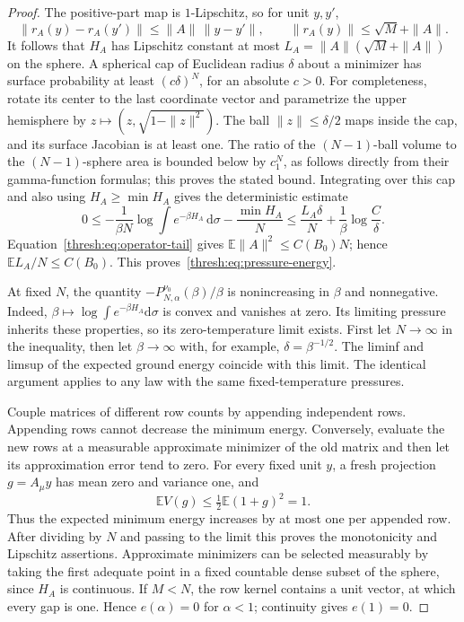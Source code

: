 \documentclass[11pt,a4paper]{article}
\numberwithin{equation}{section}
\theoremstyle{definition}
\theoremstyle{remark}
\newcommand{\E}{\mathbb E}
\newcommand{\dd}{\mathrm d}
\begin{document}
\begin{proof}
The positive-part map is $1$-Lipschitz, so for unit $y,y'$,
\[
 \|r_A(y)-r_A(y')\|\leq\|A\|\,\|y-y'\|,
 \qquad \|r_A(y)\|\leq\sqrt M+\|A\|.
\]
It follows that $H_A$ has Lipschitz constant at most
$L_A=\|A\|(\sqrt M+\|A\|)$ on the sphere.  A spherical cap of Euclidean
radius $\delta$ about a minimizer has surface probability at least
$(c\delta)^N$, for an absolute $c>0$.
For completeness, rotate its center to the last coordinate vector and
parametrize the upper hemisphere by
$z\mapsto(z,\sqrt{1-\|z\|^2})$.  The ball
$\|z\|\leq\delta/2$ maps inside the cap, and its surface Jacobian is at
least one.  The ratio of the $(N-1)$-ball volume to the
$(N-1)$-sphere area is bounded below by $c_1^N$, as follows directly
from their gamma-function formulas; this proves the stated bound.
Integrating over this cap and also using $H_A\geq\min H_A$ gives the
deterministic estimate
\[
 0\leq-\frac1{\beta N}\log\int e^{-\beta H_A}\,\dd\sigma
             -\frac{\min H_A}{N}
 \leq\frac{L_A\delta}{N}+\frac1\beta\log\frac C\delta.
\]
Equation~\eqref{thresh:eq:operator-tail} gives
$\E\|A\|^2\leq C(B_0)N$; hence $\E L_A/N\leq C(B_0)$.
This proves~\eqref{thresh:eq:pressure-energy}.

At fixed $N$, the quantity $-P_{N,\alpha}^{\nu_0}(\beta)/\beta$ is
nonincreasing in $\beta$ and nonnegative.  Indeed,
$\beta\mapsto\log\int e^{-\beta H_A}\dd\sigma$ is convex and vanishes at
zero.  Its limiting pressure inherits these properties, so its
zero-temperature limit exists.  First let $N\to\infty$ in the
inequality, then let $\beta\to\infty$ with, for example,
$\delta=\beta^{-1/2}$.  The liminf and limsup of the expected ground
energy coincide with this limit.  The identical argument applies to
any law with the same fixed-temperature pressures.

Couple matrices of different row counts by appending independent rows.
Appending rows cannot decrease the minimum energy.  Conversely,
evaluate the new rows at a measurable approximate minimizer of the old
matrix and then let its approximation error tend to zero.  For every
fixed unit $y$, a fresh projection $g=A_\mu y$ has mean zero and variance
one, and
\[
 \E V(g)\leq\tfrac12\E(1+g)^2=1.
\]
Thus the expected minimum energy increases by at most one per appended
row.  After dividing by $N$ and passing to the limit this proves the
monotonicity and Lipschitz assertions.  Approximate minimizers can be
selected measurably by taking the first adequate point in a fixed
countable dense subset of the sphere, since $H_A$ is continuous.
If $M<N$, the row kernel contains a unit vector, at which every gap is
one.  Hence $e(\alpha)=0$ for $\alpha<1$; continuity gives $e(1)=0$.
\end{proof}
\end{document}
